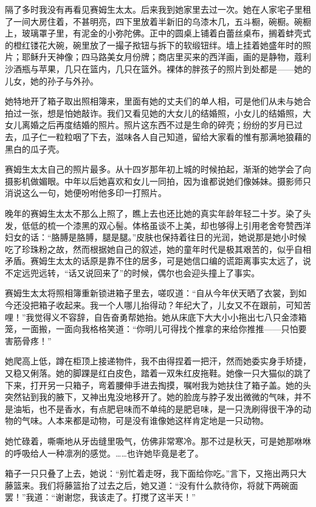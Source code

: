 \par 隔了多时我没有再看见赛姆生太太。后来我到她家里去过一次。她在人家宅子里租了一间大房住着，不甚明亮，四下里放着半新旧的乌漆木几，五斗橱，碗橱。碗橱上，玻璃罩子里，有泥金的小弥陀佛。正中的圆桌上铺着白蕾丝桌布，搁着蚌壳式的橙红镂花大碗，碗里放了一撮子揿钮与拆下的软缎钮绊。墙上挂着她盛年时的照片；耶稣升天神像；四马路美女月份牌；商店里买来的西洋画，画的是静物，蔻利沙酒瓶与苹果，几只在篮内，几只在篮外。裸体的胖孩子的照片到处都是——她的儿女，她的孙子与外孙。
\par 她特地开了箱子取出照相簿来，里面有她的丈夫们的单人相，可是他们从未与她合拍过一张，想是怕她敲诈。我们又看见她的大女儿的结婚照，小女儿的结婚照，大女儿离婚之后再度结婚的照片。照片这东西不过是生命的碎壳；纷纷的岁月已过去，瓜子仁一粒粒咽了下去，滋味各人自己知道，留给大家看的惟有那满地狼藉的黑白的瓜子壳。
\par 赛姆生太太自己的照片最多。从十四岁那年初上城的时候拍起，渐渐的她学会了向摄影机做媚眼。中年以后她喜欢和女儿一同拍，因为谁都说她们像姊妹。摄影师只消说这么一句，她便吩咐他多印一打照片。
\par 晚年的赛姆生太太不那么上照了，瞧上去也还比她的真实年龄年轻二十岁。染了头发，低低的梳一个漆黑的双心髻。体格虽谈不上美，却也够得上引用老舍夸赞西洋妇女的话：“胳膊是胳膊，腿是腿。”皮肤也保持着往日的光润，她说那是她小时候吃了珍珠粉之故，然而根据她自己的叙述，她的童年时代是极其艰苦的，似乎自相矛盾。赛姆生太太的话原是靠不住的居多，可是她信口编的谎距离事实太远了，说不定远兜远转，“话又说回来了”的时候，偶尔也会迎头撞上了事实。
\par 赛姆生太太将照相簿重新锁进箱子里去，嗟叹道：“自从今年伏天晒了衣裳，到如今还没把箱子收起来。我一个人哪儿抬得动？年纪大了，儿女又不在跟前，可知苦哩！”我觉得义不容辞，自告奋勇帮她抬。她从床底下大大小小拖出七八只金漆箱笼，一面搬，一面向我格格笑道：“你明儿可得找个推拿的来给你推推——只怕要害筋骨疼！”
\par 她爬高上低，蹲在柜顶上接递物件，我不由得捏着一把汗，然而她委实身手矫捷，又稳又俐落。她的脚踝是红白皮色，踏着一双朱红皮拖鞋。她像一只大猫似的跳了下来，打开另一只箱子，弯着腰伸手进去掏摸，嘱咐我为她扶住了箱子盖。她的头突然钻到我的腋下，又神出鬼没地移开了。她的脸庞与脖子发出微微的气味，并不是油垢，也不是香水，有点肥皂味而不单纯的是肥皂味，是一只洗刷得很干净的动物的气味。人本来都是动物，可是没有谁像她这样肯定地是一只动物。
\par 她忙碌着，嘶嘶地从牙齿缝里吸气，仿佛非常寒冷。那不过是秋天，可是她那咻咻的呼吸给人一种凛冽的感觉。……也许她毕竟是老了。
\par 箱子一只只叠了上去，她说：“别忙着走呀，我下面给你吃。”言下，又拖出两只大藤篮来。我们将藤篮抬了过去之后，她又道：“没有什么款待你，将就下两碗面罢！”我道：“谢谢您，我该走了。打搅了这半天！”
